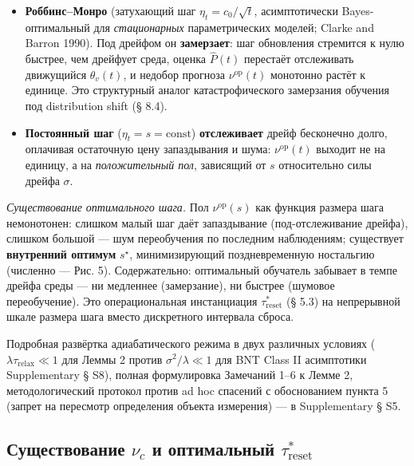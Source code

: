 \documentclass[pdflatex,sn-mathphys-ay]{sn-jnl}
\providecommand{\tightlist}{\setlength{\itemsep}{0pt}\setlength{\parskip}{0pt}}
\begin{document}
\begin{itemize}

\tightlist

\item

  \textbf{Роббинс--Монро} (затухающий шаг \(\eta_t = c_0/\sqrt{t}\), асимптотически Bayes-оптимальный для \emph{стационарных} параметрических моделей; Clarke and Barron 1990). Под дрейфом он \textbf{замерзает}: шаг обновления стремится к нулю быстрее, чем дрейфует среда, оценка \(\hat P(t)\) перестаёт отслеживать движущийся \(\theta_v(t)\), и недобор прогноза \(\nu^{\text{op}}(t)\) монотонно растёт к единице. Это структурный аналог катастрофического замерзания обучения под distribution shift (§ 8.4).

\item

  \textbf{Постоянный шаг} (\(\eta_t = s = \text{const}\)) \textbf{отслеживает} дрейф бесконечно долго, оплачивая остаточную цену запаздывания и шума: \(\nu^{\text{op}}(t)\) выходит не на единицу, а на \emph{положительный пол}, зависящий от \(s\) относительно силы дрейфа \(\sigma\).

\end{itemize}



\emph{Существование оптимального шага.} Пол \(\nu^{\text{op}}(s)\) как функция размера шага немонотонен: слишком малый шаг даёт запаздывание (под-отслеживание дрейфа), слишком большой --- шум переобучения по последним наблюдениям; существует \textbf{внутренний оптимум} \(s^\star\), минимизирующий поздневременную ностальгию (численно --- Рис. 5). Содержательно: оптимальный обучатель забывает в темпе дрейфа среды --- ни медленнее (замерзание), ни быстрее (шумовое переобучение). Это операциональная инстанциация \(\tau_{\text{reset}}^*\) (§ 5.3) на непрерывной шкале размера шага вместо дискретного интервала сброса.



Подробная развёртка адиабатического режима в двух различных условиях (\(\lambda \tau_{\text{relax}} \ll 1\) для Леммы 2 против \(\sigma^2/\lambda \ll 1\) для BNT Class II асимптотики Supplementary § S8), полная формулировка Замечаний 1--6 к Лемме 2, методологический протокол против ad hoc спасений с обоснованием пункта 5 (запрет на пересмотр определения объекта измерения) --- в Supplementary § S5.



\subsection{\texorpdfstring{Существование \(\nu_c\) и оптимальный \(\tau_{\text{reset}}^*\)}{Существование \textbackslash nu\_c и оптимальный \textbackslash tau\_\{\textbackslash text\{reset\}\}\^{}*}}\label{ux441ux443ux449ux435ux441ux442ux432ux43eux432ux430ux43dux438ux435-nu_c-ux438-ux43eux43fux442ux438ux43cux430ux43bux44cux43dux44bux439-tau_textreset}
\end{document}
